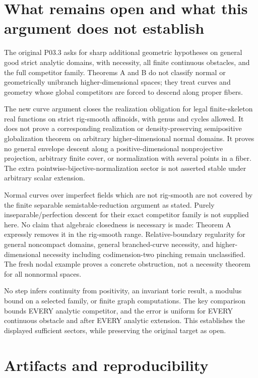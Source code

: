 \documentclass[11pt]{article}
\begin{document}
\section{What remains open and what this argument does not establish}

The original P03.3 asks for sharp additional geometric hypotheses on general good strict analytic domains, with necessity, all finite continuous obstacles, and the full competitor family. Theorems A and B do not classify normal or geometrically unibranch higher-dimensional spaces; they treat curves and geometry whose global competitors are forced to descend along proper fibers.

The new curve argument closes the realization obligation for legal finite-skeleton real functions on strict rig-smooth affinoids, with genus and cycles allowed. It does not prove a corresponding realization or density-preserving semipositive globalization theorem on arbitrary higher-dimensional normal domains. It proves no general envelope descent along a positive-dimensional nonprojective projection, arbitrary finite cover, or normalization with several points in a fiber. The extra pointwise-bijective-normalization sector is not asserted stable under arbitrary scalar extension.

Normal curves over imperfect fields which are not rig-smooth are not covered by the finite separable semistable-reduction argument as stated. Purely inseparable/perfection descent for their exact competitor family is not supplied here. No claim that algebraic closedness is necessary is made: Theorem A expressly removes it in the rig-smooth range. Relative-boundary regularity for general noncompact domains, general branched-curve necessity, and higher-dimensional necessity including codimension-two pinching remain unclassified. The fresh nodal example proves a concrete obstruction, not a necessity theorem for all nonnormal spaces.

No step infers continuity from positivity, an invariant toric result, a modulus bound on a selected family, or finite graph computations. The key comparison bounds EVERY analytic competitor, and the error is uniform for EVERY continuous obstacle and after EVERY analytic extension. This establishes the displayed sufficient sectors, while preserving the original target as open.

\section{Artifacts and reproducibility}
\end{document}
